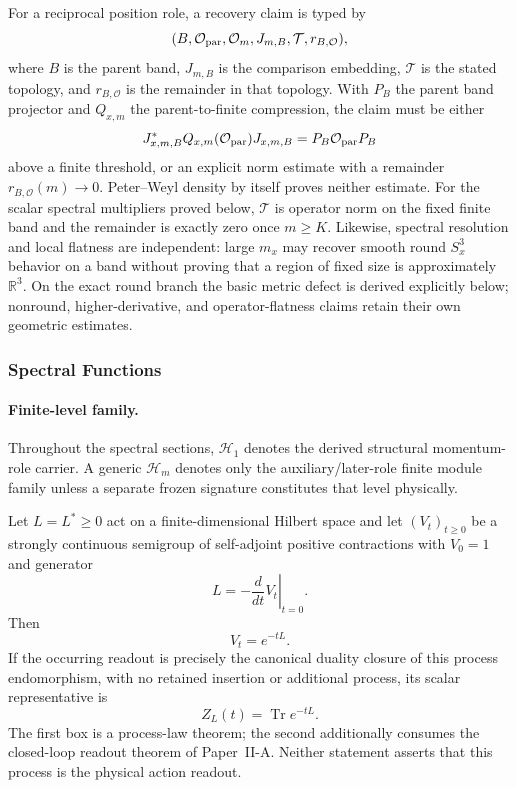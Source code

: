 \documentclass[12pt,a4paper]{article}
\begin{document}
For a reciprocal position role, a recovery claim is typed by
\[
 (B,\mathcal O_{\rm par},\mathcal O_m,J_{m,B},
   \mathcal T,r_{B,\mathcal O}),
\]
where \(B\) is the parent band, \(J_{m,B}\) is the comparison embedding,
\(\mathcal T\) is the stated topology, and \(r_{B,\mathcal O}\) is the
remainder in that topology.  With \(P_B\) the parent band projector and
\(Q_{x,m}\) the parent-to-finite compression, the claim must be either
\[
 J_{x,m,B}^*Q_{x,m}(\mathcal O_{\rm par})J_{x,m,B}
 =P_B\mathcal O_{\rm par}P_B
\]
above a finite threshold, or an explicit norm estimate with a remainder
\(r_{B,\mathcal O}(m)\to0\).  Peter--Weyl density by itself proves neither
estimate.  For the scalar spectral multipliers proved below,
\(\mathcal T\) is operator norm on the fixed finite band and the remainder is
exactly zero once \(m\ge K\).
Likewise, spectral resolution and local flatness are independent: large
\(m_x\) may recover smooth round \(S^3_x\) behavior on a band without proving
that a region of fixed size is approximately \(\mathbb R^3\).  On the exact
round branch the basic metric defect is derived explicitly below; nonround,
higher-derivative, and operator-flatness claims retain their own geometric
estimates.

\subsubsection{Spectral Functions}
\label{p2:sec:spectral-functions}

\paragraph{Finite-level family.}
Throughout the spectral sections, \(\mathcal H_1\) denotes the derived
structural momentum-role carrier.  A generic \(\mathcal H_m\) denotes only the
auxiliary/later-role finite module family unless a separate frozen signature
constitutes that level physically.

\begin{theorem}
\label{p2d:thm:heat-semigroup-rigidity}
Let \(L=L^*\ge0\) act on a finite-dimensional Hilbert space and let
\((V_t)_{t\ge0}\) be a strongly continuous semigroup of self-adjoint positive
contractions with \(V_0=1\) and generator
\[
 L=-\left.\frac{d}{dt}V_t\right|_{t=0}.
\]
Then
\[
 \boxed{V_t=e^{-tL}.}
\]
If the occurring readout is precisely the canonical duality closure of
this process endomorphism, with no retained insertion or additional process,
its scalar representative is
\[
 \boxed{Z_L(t)=\operatorname{Tr}e^{-tL}.}
\]
The first box is a process-law theorem; the second additionally consumes the
closed-loop readout theorem of Paper~II-A.  Neither statement asserts that
this process is the physical action readout.
\end{theorem}
\end{document}
